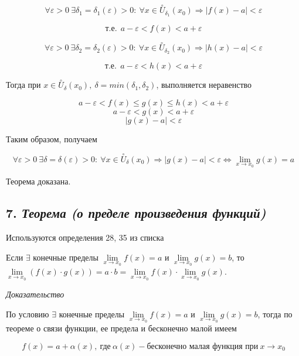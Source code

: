 $$
\forall {\varepsilon}  > 0 \ \exists \delta_1= \delta_1 ({\varepsilon} ) > 0: \ \forall x \in \overset{\circ}U_{\delta_1}(x_0) \Rightarrow | f(x) - a|  < {\varepsilon}
$$

$$
\text{т.е.} \ \ a - {\varepsilon} < f(x) < a + {\varepsilon}
$$

$$
\forall {\varepsilon}  > 0 \ \exists \delta_2= \delta_2 ({\varepsilon} ) > 0: \ \forall x \in \overset{\circ}U_{\delta_2}(x_0) \Rightarrow | h(x) - a|  < {\varepsilon}
$$

$$
\text{т.е.} \ \ a - {\varepsilon} < h(x) < a + {\varepsilon}
$$

Тогда при $x \in \overset{\circ}U_{\delta}(x_0), \ \delta = min(\delta_1, \delta_2)$, выполняется неравенство

$$
a - {\varepsilon} < f(x) \leqslant g(x) \leqslant h(x) < a+ {\varepsilon}
$$ $$
a - {\varepsilon} <  g(x) < a+ {\varepsilon}
$$ $$
| g(x) - a|  < {\varepsilon}
$$

Таким образом, получаем

$$
\forall {\varepsilon} > 0 \ \exists \delta = \delta({\varepsilon}) > 0: \ \forall x \in \overset{\circ}U_{\delta}(x_0) \Rightarrow | g(x) - a|  < {\varepsilon} \iff \lim\limits_{x \to x_0} g(x) = a
$$

Теорема доказана.
\newpage 
\subsection*{7. \textit{Теорема (о пределе произведения функций)}}
\begin{Quote2} 
\small\centering 

Используются определения 28, 35 из списка \end{Quote2} 

Если $\exists$ конечные пределы $\lim\limits_{x \to x_0}f(x)=a$ и $\lim\limits_{x \to x_0}g(x) = b$, то $\lim\limits_{x \to x_0}(f(x)\cdot g(x)) = a\cdot b = \lim\limits_{x \to x_0}f(x)\cdot \lim\limits_{x \to x_0}g(x)$.
\vspace*{20pt} 

\textit{Доказательство}

По условию $\exists$ конечные пределы $\lim\limits_{x \to x_0}f(x)=a$ и $\lim\limits_{x \to x_0}g(x) = b$, тогда по теореме о связи функции, ее предела и бесконечно малой имеем

$$
f(x) = a + \alpha(x), \ \text{где} \ \alpha(x) - \text{бесконечно малая функция при} \ x \rightarrow x_0 
$$

